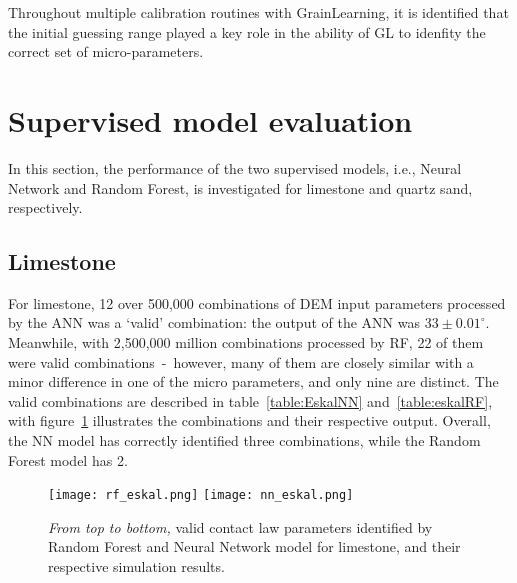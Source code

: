 Throughout multiple calibration routines with GrainLearning, it is identified that the initial guessing range played a key role in the ability of GL to idenfity the correct set of micro-parameters.


\section{Supervised model evaluation}\label{section:supervisedPerformance}

In this section, the performance of the two supervised models, i.e., Neural Network and Random Forest, is investigated for limestone and quartz sand, respectively. 

\subsection{Limestone}

For limestone, 12 over 500,000 combinations of DEM input parameters processed by the ANN was a `valid' combination: the output of the ANN was $33\pm 0.01^{\circ}$. Meanwhile, with 2,500,000 million combinations processed by RF, 22 of them were valid combinations~-~however, many of them are closely similar with a minor difference in one of the micro parameters, and only nine are distinct. The valid combinations are described in table~\ref{table:EskalNN} and~\ref{table:eskalRF}, with figure~\ref{fig:EskalNNRF} illustrates the combinations and their respective output. Overall, the NN model has correctly identified three combinations, while the Random Forest model has 2. 


\begin{figure}[H]
    \centering
    \texttt{[image: rf\_eskal.png]}
    \texttt{[image: nn\_eskal.png]}
    \caption{\textit{From top to bottom,} valid contact law parameters identified by Random Forest and Neural Network model for limestone, and their respective simulation results.}\label{fig:EskalNNRF}
\end{figure}

